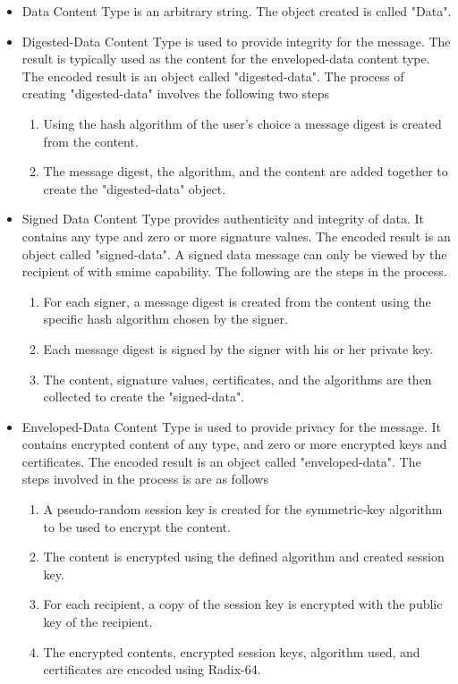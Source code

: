 \begin{itemize}
\item Data Content Type is an arbitrary string.  The object created is called "Data".
\item Digested-Data Content Type is used to provide integrity for the message. The result is typically used as the content for the enveloped-data content type. The encoded result is an object called "digested-data". The process of creating "digested-data" involves the following two steps
\begin{enumerate}
\item Using the hash algorithm of the user's choice a message digest is created from the content.
\item The message digest, the algorithm, and the content are added together to create the "digested-data" object.
\end{enumerate}
\item Signed Data Content Type provides authenticity and integrity of data. It contains any type and zero or more signature values. The encoded result is an object called "signed-data". A signed data message can only be viewed by the recipient of with \acrshort{smime} capability. The following are the steps in the process.
\begin{enumerate}
\item For each signer, a message digest is created from the content using the specific hash algorithm chosen by the signer.
\item Each message digest is signed by the signer with his or her private key.
\item The content, signature values, certificates, and the algorithms are then collected to create the "signed-data".
\end{enumerate}
\item Enveloped-Data Content Type is used to provide privacy for the message. It contains encrypted content of any type, and zero or more encrypted keys and certificates. The encoded result is an object called "enveloped-data". The steps involved in the process is are as follows
\begin{enumerate}
\item A pseudo-random session key is created for the symmetric-key algorithm to be used to encrypt the content.
\item The content is encrypted using the defined algorithm and created session key.
\item For each recipient, a copy of the session key is encrypted with the public key of the recipient.
\item The encrypted contents, encrypted session keys, algorithm used, and certificates are encoded using Radix-64.
\end{enumerate}
\end{itemize}

